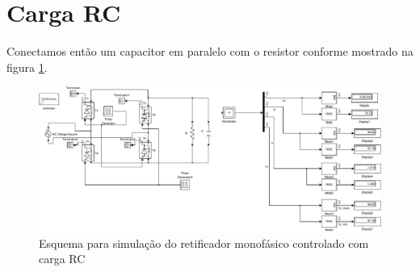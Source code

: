 \documentclass{report}
\begin{document}
\section{Carga RC}
Conectamos então um capacitor em paralelo com o resistor conforme mostrado na figura \ref{fig:rcsim}.
\begin{figure}[H]
	\centering
	\includegraphics[width=\linewidth]{matlab/rcsim}
	\caption{Esquema para simulação do retificador monofásico controlado com carga RC}
	\label{fig:rcsim}
\end{figure}
\end{document}
